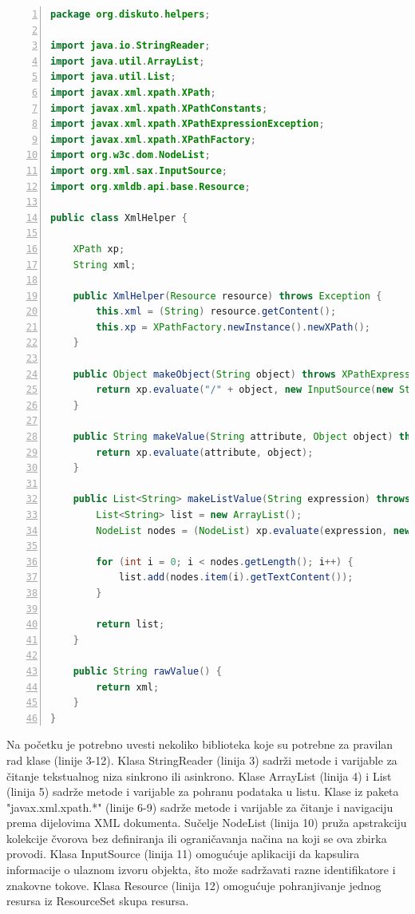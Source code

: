 \documentclass{foi}
\begin{document}
\begin{lstlisting}[language=Java, numbers=left, caption=Sadržaj pomoćne klase "XmlHelper.java", captionpos=b, label={XmlHelper.java}]
package org.diskuto.helpers;

import java.io.StringReader;
import java.util.ArrayList;
import java.util.List;
import javax.xml.xpath.XPath;
import javax.xml.xpath.XPathConstants;
import javax.xml.xpath.XPathExpressionException;
import javax.xml.xpath.XPathFactory;
import org.w3c.dom.NodeList;
import org.xml.sax.InputSource;
import org.xmldb.api.base.Resource;

public class XmlHelper {

    XPath xp;
    String xml;

    public XmlHelper(Resource resource) throws Exception {
        this.xml = (String) resource.getContent();
        this.xp = XPathFactory.newInstance().newXPath();
    }

    public Object makeObject(String object) throws XPathExpressionException {
        return xp.evaluate("/" + object, new InputSource(new StringReader(xml)), XPathConstants.NODE);
    }

    public String makeValue(String attribute, Object object) throws XPathExpressionException {
        return xp.evaluate(attribute, object);
    }

    public List<String> makeListValue(String expression) throws XPathExpressionException {
        List<String> list = new ArrayList();
        NodeList nodes = (NodeList) xp.evaluate(expression, new InputSource(new StringReader(xml)), XPathConstants.NODESET);

        for (int i = 0; i < nodes.getLength(); i++) {
            list.add(nodes.item(i).getTextContent());
        }

        return list;
    }

    public String rawValue() {
        return xml;
    }
}
\end{lstlisting}

Na početku je potrebno uvesti nekoliko biblioteka koje su potrebne za pravilan rad klase (linije 3-12). Klasa StringReader (linija 3) sadrži metode i varijable za čitanje tekstualnog niza sinkrono ili asinkrono. Klase ArrayList (linija 4) i List (linija 5)  sadrže metode i varijable za pohranu podataka u listu. Klase iz paketa "javax.xml.xpath.*" (linije 6-9) sadrže metode i varijable za čitanje i navigaciju prema dijelovima XML dokumenta. Sučelje NodeList (linija 10) pruža apstrakciju kolekcije čvorova bez definiranja ili ograničavanja načina na koji se ova zbirka provodi. Klasa InputSource (linija 11) omogućuje aplikaciji da kapsulira informacije o ulaznom izvoru objekta, što može sadržavati razne identifikatore i znakovne tokove. Klasa Resource (linija 12) omogućuje pohranjivanje jednog resursa iz ResourceSet skupa resursa. 
\end{document}
